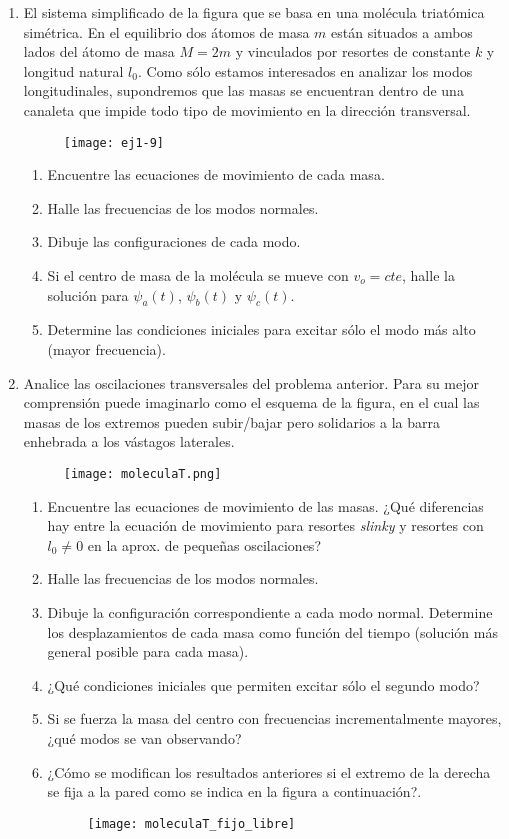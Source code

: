 \documentclass[11pt,spanish,a4paper]{article}
\begin{document}
\begin{enumerate}
\item El sistema simplificado de la figura que se basa en una molécula triatómica simétrica.
En el equilibrio dos átomos de masa $m$ están situados a ambos lados del átomo de masa $M=2m$ y vinculados por resortes de constante $k$ y longitud natural $l_0$.
Como sólo estamos interesados en analizar los modos longitudinales, supondremos que las masas se encuentran dentro de una canaleta que impide todo tipo de movimiento en la dirección transversal. 
\begin{figure}[h]
\centering{}\texttt{[image: ej1-9]}
\end{figure}
\begin{enumerate}
	\item Encuentre las ecuaciones de movimiento de cada masa. 
	\item Halle las frecuencias de los modos normales. 
	\item Dibuje las configuraciones de cada modo. 
\item Si el centro de masa de la molécula  se mueve con $v_o=cte$, halle la solución para $\psi_a(t)$, $\psi_b(t)$ y $\psi_c(t)$.
	\item Determine las condiciones iniciales para excitar sólo el modo más alto (mayor frecuencia).
\end{enumerate}



\item Analice las oscilaciones transversales del problema anterior.
Para su mejor comprensión puede imaginarlo como el esquema de la figura, en el cual las masas de los extremos pueden subir/bajar pero solidarios a la barra enhebrada a los vástagos laterales. 
\begin{figure}[h]
\centering{}
\texttt{[image: moleculaT.png]}
\end{figure}
\begin{enumerate}
	\item Encuentre las ecuaciones de movimiento de las masas. ¿Qué diferencias hay entre la ecuación de movimiento para resortes \emph{slinky} y resortes con $l_0\ne 0$ en la aprox. de pequeñas oscilaciones?
	\item Halle las frecuencias de los modos normales.
	\item Dibuje la configuración correspondiente a cada modo normal.
Determine los desplazamientos de cada masa como función del tiempo (solución más general posible para cada masa).
	\item ¿Qué condiciones iniciales que permiten excitar sólo el segundo modo?
	\item Si se fuerza la masa del centro con frecuencias incrementalmente mayores, ¿qué modos se van observando?
	\item ¿Cómo se modifican los resultados anteriores si el extremo de la derecha se fija a la pared como se indica en la figura a continuación?.
\begin{figure}[h]
	\centering{}
	\texttt{[image: moleculaT\_fijo\_libre]}
\end{figure} 
\end{enumerate}




\end{enumerate}
\end{document}
